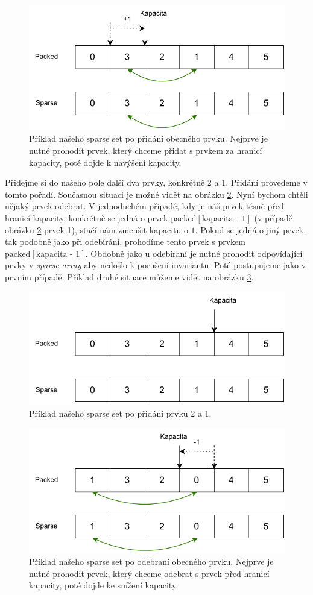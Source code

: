 \begin{figure}
    \centering
    \includegraphics[width=0.6\linewidth]{img/sparse_set_two.pdf}
    \caption{Příklad našeho sparse set po přidání obecného prvku. Nejprve je nutné prohodit prvek, který chceme přidat s prvkem za hranicí kapacity, poté dojde k navýšení kapacity.}
    \label{fig:sparse_set_two}
\end{figure}

Přidejme si do našeho pole další dva prvky, konkrétně $2$ a $1$. Přidání provedeme v tomto pořadí. Současnou situaci je možné vidět na obrázku \ref{fig:sparse_set_four}. Nyní bychom chtěli nějaký prvek odebrat. V jednoduchém případě, kdy je náš prvek těsně před hranicí kapacity, konkrétně se jedná o prvek $\text{packed}\left[\text{kapacita - 1}\right]$ (v případě obrázku \ref{fig:sparse_set_four} prvek 1), stačí nám zmenšit kapacitu o $1$. Pokud se jedná o jiný prvek, tak podobně jako při odebírání, prohodíme tento prvek s prvkem $\text{packed}\left[\text{kapacita - 1}\right]$. Obdobně jako u odebíraní je nutné prohodit odpovídající prvky v \textit{sparse array} aby nedošlo k porušení invariantu. Poté postupujeme jako v prvním případě. Příklad druhé situace můžeme vidět na obrázku \ref{fig:sparse_set_three}.

\begin{figure}
    \centering
    \includegraphics[width=0.6\linewidth]{img/sparse_set_four.pdf}
    \caption{Příklad našeho sparse set po přidání prvků 2 a 1.}
    \label{fig:sparse_set_four}
\end{figure}

\begin{figure}
    \centering
    \includegraphics[width=0.6\linewidth]{img/sparse_set_three.pdf}
    \caption{Příklad našeho sparse set po odebraní obecného prvku. Nejprve je nutné prohodit prvek, který chceme odebrat s prvek před hranicí kapacity, poté dojde ke snížení kapacity.}
    \label{fig:sparse_set_three}
\end{figure}

